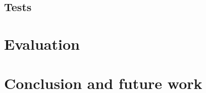 \documentclass[12pt, a4paper]{article}
\begin{document}
\subsection{Tests}

\section{Evaluation}


\section{Conclusion and future work}




\nocite{methodology}
 
 
 
\end{document}
